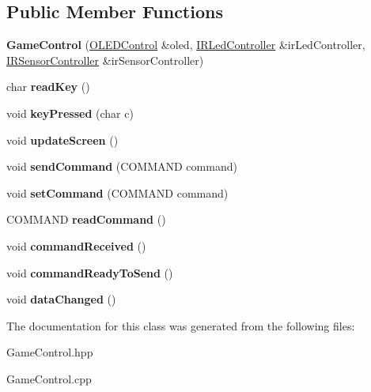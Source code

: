 \subsection*{Public Member Functions}
\begin{DoxyCompactItemize}
\item 
{\bfseries Game\+Control} (\hyperlink{class_o_l_e_d_control}{O\+L\+E\+D\+Control} \&oled, \hyperlink{class_i_r_led_controller}{I\+R\+Led\+Controller} \&ir\+Led\+Controller, \hyperlink{class_i_r_sensor_controller}{I\+R\+Sensor\+Controller} \&ir\+Sensor\+Controller)\hypertarget{class_game_control_aee5fbcd091eaa499019298f3d91cbfc2}{}\label{class_game_control_aee5fbcd091eaa499019298f3d91cbfc2}

\item 
char {\bfseries read\+Key} ()\hypertarget{class_game_control_af7aad5b0eb8c4e906327bdd5e30e690d}{}\label{class_game_control_af7aad5b0eb8c4e906327bdd5e30e690d}

\item 
void {\bfseries key\+Pressed} (char c)\hypertarget{class_game_control_a1637dc92f2db2b4cba657a0f18e50091}{}\label{class_game_control_a1637dc92f2db2b4cba657a0f18e50091}

\item 
void {\bfseries update\+Screen} ()\hypertarget{class_game_control_ac056355ace7eed7b8acb63737a382a13}{}\label{class_game_control_ac056355ace7eed7b8acb63737a382a13}

\item 
void {\bfseries send\+Command} (C\+O\+M\+M\+A\+ND command)\hypertarget{class_game_control_a18bd1bf71ddfcb6f07d3b1f5826704e6}{}\label{class_game_control_a18bd1bf71ddfcb6f07d3b1f5826704e6}

\item 
void {\bfseries set\+Command} (C\+O\+M\+M\+A\+ND command)\hypertarget{class_game_control_aa6db4a52d5a3660ed013e87d5eae96cd}{}\label{class_game_control_aa6db4a52d5a3660ed013e87d5eae96cd}

\item 
C\+O\+M\+M\+A\+ND {\bfseries read\+Command} ()\hypertarget{class_game_control_a5a579c1fc140da5c6b06b73290ac0dd2}{}\label{class_game_control_a5a579c1fc140da5c6b06b73290ac0dd2}

\item 
void {\bfseries command\+Received} ()\hypertarget{class_game_control_a2c95a96fbbcb74340bf4d61437dec941}{}\label{class_game_control_a2c95a96fbbcb74340bf4d61437dec941}

\item 
void {\bfseries command\+Ready\+To\+Send} ()\hypertarget{class_game_control_afb4681bd9b3c4b899e05cf79643fab96}{}\label{class_game_control_afb4681bd9b3c4b899e05cf79643fab96}

\item 
void {\bfseries data\+Changed} ()\hypertarget{class_game_control_ae8602707135ba8a40789e31e4852d4a7}{}\label{class_game_control_ae8602707135ba8a40789e31e4852d4a7}

\end{DoxyCompactItemize}


The documentation for this class was generated from the following files\+:\begin{DoxyCompactItemize}
\item 
Game\+Control.\+hpp\item 
Game\+Control.\+cpp\end{DoxyCompactItemize}
